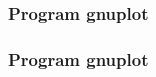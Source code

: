 \subsubsection{Program gnuplot}
\begin{frame}
	\frametitle{Program gnuplot}
	\UnderConstruction
\end{frame}

\endinput
